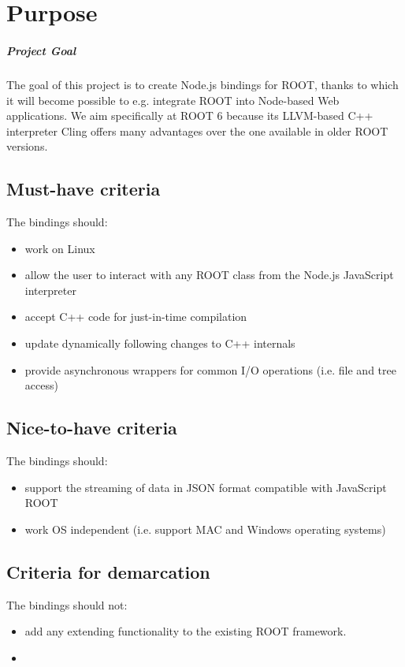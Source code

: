 \chapter{Purpose}
\paragraph{Project Goal}
The goal of this project is to create Node.js bindings for ROOT, thanks to which it will become possible to e.g. integrate ROOT into Node-based Web applications.
We aim specifically at ROOT 6 because its LLVM-based C++ interpreter Cling offers many advantages over the one available in older ROOT versions.
\section{Must-have criteria}
The bindings should:
\begin{itemize}
	\item work on Linux
	\item allow the user to interact with any ROOT class from the Node.js JavaScript interpreter
	\item accept C++ code for just-in-time compilation
	\item update dynamically following changes to C++ internals
	\item provide asynchronous wrappers for common I/O operations (i.e. file and tree access)
\end{itemize}
\section{Nice-to-have criteria}
The bindings should:
\begin{itemize}
	\item support the streaming of data in JSON format compatible with JavaScript ROOT
	\item work OS independent (i.e. support MAC and Windows operating systems)
\end{itemize}
\section{Criteria for demarcation}
The bindings should not:
\begin{itemize}
	\item add any extending functionality to the existing ROOT framework.
	\item 
\end{itemize}